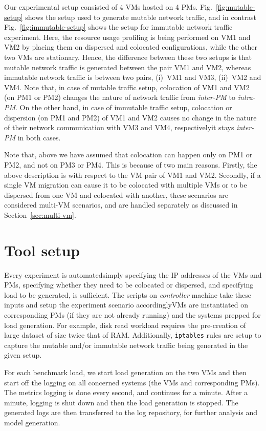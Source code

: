 Our experimental setup consisted of 4 VMs hosted on 4 PMs.
Fig.~\ref{fig:mutable-setup} shows the setup used to generate
mutable network traffic, and in contrast Fig.~\ref{fig:immutable-setup}
shows the setup for immutable network traffic experiment.
Here, the resource usage profiling is being performed
on VM1 and VM2 by placing them on dispersed and colocated
configurations, while the other two VMs are stationary.
Hence, the difference between these two setups is that 
mutable network traffic is generated between the pair VM1 and VM2,
whereas immutable network traffic is between two pairs,
(i)~VM1 and VM3, (ii)~VM2 and VM4.
Note that, in case of mutable traffic setup, colocation of
VM1 and VM2 (on PM1 or PM2) changes the nature of network traffic from 
\textit{inter-PM} to \textit{intra-PM}.
On the other hand, in case of immutable traffic setup, colocation or 
dispersion (on PM1 and PM2)
of VM1 and VM2 causes no change in the nature of their
network communication with VM3 and VM4, respectively\textemdash{}it stays
\textit{inter-PM} in both cases.

Note that, above we have assumed that colocation can happen only on 
PM1 or PM2, and not on PM3 or PM4. This is because of two main reasons.
Firstly, the above description is with respect to the VM pair of VM1 
and VM2. Secondly, if a single VM migration can cause it to be
colocated with multiple VMs or to be dispersed from one VM and
colocated with another, these scenarios are considered multi-VM
scenarios, and are handled separately as discussed in Section~\ref{sec:multi-vm}.

\section{Tool setup}
Every experiment is automated\textemdash{}simply specifying the IP addresses of the VMs and PMs,
specifying whether they need to be colocated or dispersed, 
and specifying load to be generated, is sufficient. The scripts
on \textit{controller} machine take these inputs and setup the experiment scenario
accordingly\textemdash{}VMs are instantiated on corresponding PMs (if they are not already running)
and the systems prepped for load generation. For example, disk read workload requires
the pre-creation of large dataset of size twice that of RAM. Additionally, \texttt{iptables}
rules are setup to capture the mutable and/or immutable network traffic being generated
in the given setup.

For each benchmark load, we start load generation on the two VMs and then start off the
logging on all concerned systems (the VMs and corresponding PMs). The metrics logging
is done every second, and continues for a minute. After a minute, logging is shut down and then
the load generation is stopped. The generated logs are then transferred to the log 
repository, for further analysis and model generation. 

